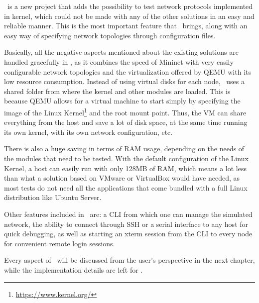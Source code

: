 \project\ is a new project that adds the possibility to test network protocols implemented in kernel, which could not be made with any of the other solutions in an easy and reliable manner.
This is the most important feature that \project\ brings, along with an easy way of specifying network topologies through configuration files.

Basically, all the negative aspects mentioned about the existing solutions are handled gracefully in \project, as it combines the speed of Mininet with very easily configurable network topologies and the virtualization offered by QEMU with its low resource consumption.
Instead of using virtual disks for each node, \project\ uses a shared folder from where the kernel and other modules are loaded.
This is because QEMU allows for a virtual machine to start simply by specifying the image of the Linux Kernel\footnote{\url{https://www.kernel.org/}} and the root mount point.
Thus, the VM can share everything from the host and save a lot of disk space, at the same time running its own kernel, with its own network configuration, etc.

There is also a huge saving in terms of RAM usage, depending on the needs of the modules that need to be tested.
With the default configuration of the Linux Kernel, a host can easily run with only 128MB of RAM, which means a lot less than what a solution based on VMware or VirtualBox would have needed, as most tests do not need all the applications that come bundled with a full Linux distribution like Ubuntu Server.

Other features included in \project\ are: a CLI from which one can manage the simulated network, the ability to connect through SSH or a serial interface to any host for quick debugging, as well as starting an xterm session from the CLI to every node for convenient remote login sessions.

Every aspect of \project\ will be discussed from the user's perspective in the next chapter, while the implementation details are left for .
